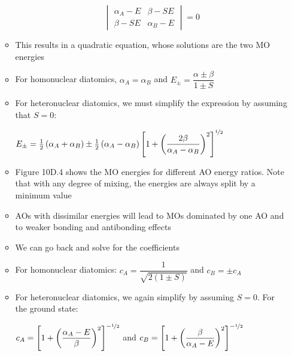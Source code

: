 \documentclass[12pt, openany, letterpaper]{memoir}
\begin{document}
\begin{itemize}
\begin{itemize}
		\[\begin{vmatrix} 
		\alpha_A - E & \beta - SE \\
		\beta - SE & \alpha_B-E
		\end{vmatrix} =0\]
		\item This results in a quadratic equation, whose solutions are the two MO energies
		\item For homonuclear diatomics, $\alpha_A=\alpha_B$ and $E_\pm = \dfrac{\alpha\pm\beta}{1\pm S}$
		\item For heteronuclear diatomics, we must simplify the expression by assuming that $S=0$:
		
		$E_\pm = \frac{1}{2}\left(\alpha_A+\alpha_B\right) \pm\frac{1}{2}\left(\alpha_A-\alpha_B\right) \left[1+\left(\dfrac{2\beta}{\alpha_A-\alpha_B}\right)^2\right]^{\nicefrac{1}{2}}$
		\item Figure 10D.4 shows the MO energies for different AO energy ratios. Note that with any degree of mixing, the energies are always split by a minimum value
		\item AOs with dissimilar energies will lead to MOs dominated by one AO and to weaker bonding and antibonding effects
		\item We can go back and solve for the coefficients
		\item For homonuclear diatomics: $c_A=\dfrac{1}{\sqrt{2(1\pm S)}}$ and $c_B = \pm c_A$
		\item For heteronuclear diatomics, we again simplify by assuming $S=0$. For the ground state:
		
		$c_A = \left[1+\left(\dfrac{\alpha_A-E}{\beta}\right)^2\right]^{-\nicefrac{1}{2}}$ and $c_B = \left[1+\left(\dfrac{\beta}{\alpha_A-E}\right)^2\right]^{-\nicefrac{1}{2}}$
	\end{itemize}
\end{itemize}
\end{document}
